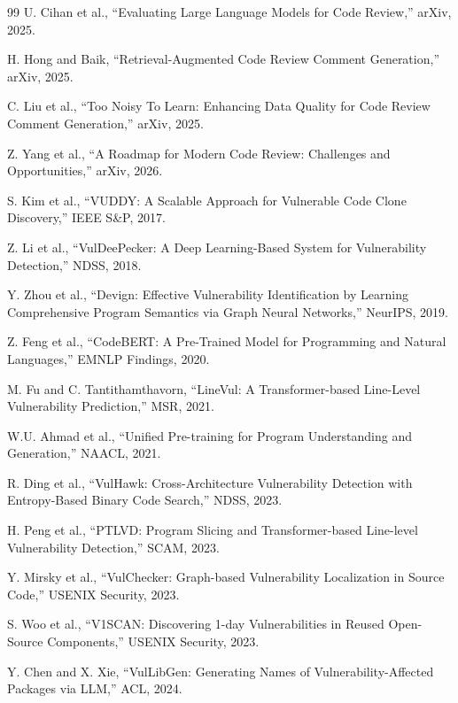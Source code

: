 \documentclass[11pt,a4paper,onecolumn]{article}
\begin{document}
\begin{thebibliography}{99}
U. Cihan et al., ``Evaluating Large Language Models for Code Review,'' arXiv, 2025.

H. Hong and Baik, ``Retrieval-Augmented Code Review Comment Generation,'' arXiv, 2025.

C. Liu et al., ``Too Noisy To Learn: Enhancing Data Quality for Code Review Comment Generation,'' arXiv, 2025.

Z. Yang et al., ``A Roadmap for Modern Code Review: Challenges and Opportunities,'' arXiv, 2026.


S. Kim et al., ``VUDDY: A Scalable Approach for Vulnerable Code Clone Discovery,'' IEEE S\&P, 2017.

Z. Li et al., ``VulDeePecker: A Deep Learning-Based System for Vulnerability Detection,'' NDSS, 2018.

Y. Zhou et al., ``Devign: Effective Vulnerability Identification by Learning Comprehensive Program Semantics via Graph Neural Networks,'' NeurIPS, 2019.

Z. Feng et al., ``CodeBERT: A Pre-Trained Model for Programming and Natural Languages,'' EMNLP Findings, 2020.

M. Fu and C. Tantithamthavorn, ``LineVul: A Transformer-based Line-Level Vulnerability Prediction,'' MSR, 2021.

W.U. Ahmad et al., ``Unified Pre-training for Program Understanding and Generation,'' NAACL, 2021.

R. Ding et al., ``VulHawk: Cross-Architecture Vulnerability Detection with Entropy-Based Binary Code Search,'' NDSS, 2023.

H. Peng et al., ``PTLVD: Program Slicing and Transformer-based Line-level Vulnerability Detection,'' SCAM, 2023.

Y. Mirsky et al., ``VulChecker: Graph-based Vulnerability Localization in Source Code,'' USENIX Security, 2023.

S. Woo et al., ``V1SCAN: Discovering 1-day Vulnerabilities in Reused Open-Source Components,'' USENIX Security, 2023.

Y. Chen and X. Xie, ``VulLibGen: Generating Names of Vulnerability-Affected Packages via LLM,'' ACL, 2024.


\end{thebibliography}
\end{document}
